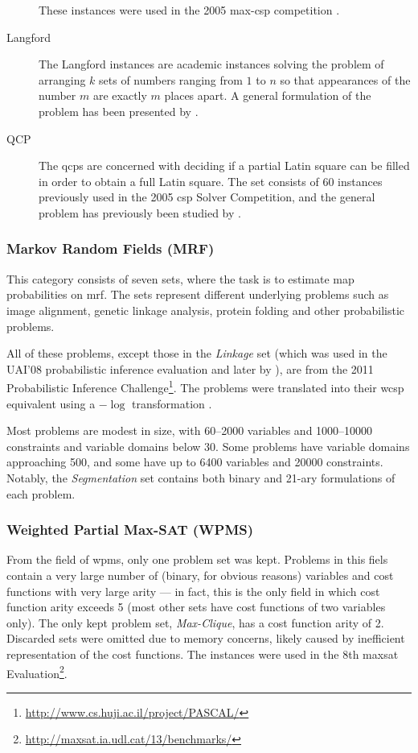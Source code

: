 \begin{description}
		These instances were used in the 2005 max-\gls{csp} competition \parencite{Boussemart05}.
	\item[Langford]
		The Langford instances are academic instances solving the problem of arranging \(k\) sets of numbers ranging from \(1\) to \(n\) so that appearances of the number \(m\) are exactly \(m\) places apart.
		A general formulation of the problem has been presented by \textcite{Linek03}.
	\item[QCP]
		The \glspl{qcp} are concerned with deciding if a partial Latin square can be filled in order to obtain a full Latin square.
		The set consists of 60 instances previously used in the 2005 \gls{csp} Solver Competition, and the general problem has previously been studied by \textcite{Gomes02}.
\end{description}

\subsubsection{Markov Random Fields (MRF)}
This category consists of seven sets, where the task is to estimate \gls{map} probabilities on \gls{mrf}. The sets represent different underlying problems such as image alignment, genetic linkage analysis, protein folding and other probabilistic problems.

All of these problems, except those in the \emph{Linkage} set (which was used in the UAI'08 probabilistic inference evaluation and later by \textcites{Favier11}{Kishimoto13}), are from the 2011 Probabilistic Inference Challenge\footnote{\url{http://www.cs.huji.ac.il/project/PASCAL/}}.
The problems were translated into their \gls{wcsp} equivalent using a \(-\log{}\) transformation \parencite[\pno~4]{deGivry14}.

Most problems are modest in size, with \numrange{60}{2000} variables and \numrange{1000}{10000} constraints and variable domains below \num{30}. 
Some problems have variable domains approaching \num{500}, and some have up to \num{6400} variables and \num{20000} constraints.
Notably, the \emph{Segmentation} set contains both binary and 21-ary formulations of each problem.


\subsubsection{Weighted Partial Max-SAT (WPMS)}
From the field of \gls{wpms}, only one problem set was kept.
Problems in this fiels contain a very large number of (binary, for obvious reasons) variables and cost functions with very large arity --- in fact, this is the only field in which cost function arity exceeds \num{5} (most other sets have cost functions of two variables only).
The only kept problem set, \emph{Max-Clique}, has a cost function arity of \num{2}.
Discarded sets were omitted due to memory concerns, likely caused by inefficient representation of the cost functions.
The instances were used in the 8th \Gls{maxsat} Evaluation\footnote{\url{http://maxsat.ia.udl.cat/13/benchmarks/}}.

